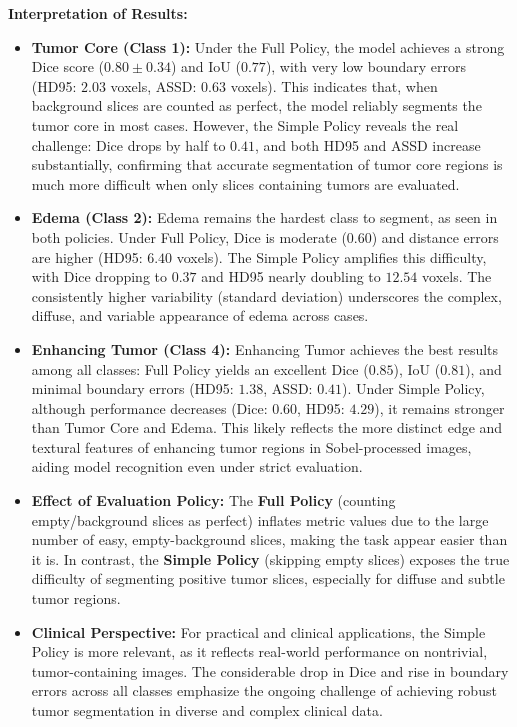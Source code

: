 \clearpage

\textbf{Interpretation of Results:}
\vspace{-1em}
\begin{itemize}
    \item \textbf{Tumor Core (Class 1):}
    Under the Full Policy, the model achieves a strong Dice score ($0.80 \pm 0.34$) and IoU ($0.77$), with very low boundary errors (HD95: $2.03$ voxels, ASSD: $0.63$ voxels). This indicates that, when background slices are counted as perfect, the model reliably segments the tumor core in most cases. However, the Simple Policy reveals the real challenge: Dice drops by half to $0.41$, and both HD95 and ASSD increase substantially, confirming that accurate segmentation of tumor core regions is much more difficult when only slices containing tumors are evaluated.

    \item \textbf{Edema (Class 2):}
    Edema remains the hardest class to segment, as seen in both policies. Under Full Policy, Dice is moderate ($0.60$) and distance errors are higher (HD95: $6.40$ voxels). The Simple Policy amplifies this difficulty, with Dice dropping to $0.37$ and HD95 nearly doubling to $12.54$ voxels. The consistently higher variability (standard deviation) underscores the complex, diffuse, and variable appearance of edema across cases.

    \item \textbf{Enhancing Tumor (Class 4):}
    Enhancing Tumor achieves the best results among all classes: Full Policy yields an excellent Dice ($0.85$), IoU ($0.81$), and minimal boundary errors (HD95: $1.38$, ASSD: $0.41$). Under Simple Policy, although performance decreases (Dice: $0.60$, HD95: $4.29$), it remains stronger than Tumor Core and Edema. This likely reflects the more distinct edge and textural features of enhancing tumor regions in Sobel-processed images, aiding model recognition even under strict evaluation.

    \item \textbf{Effect of Evaluation Policy:}
    The \textbf{Full Policy} (counting empty/background slices as perfect) inflates metric values due to the large number of easy, empty-background slices, making the task appear easier than it is. In contrast, the \textbf{Simple Policy} (skipping empty slices) exposes the true difficulty of segmenting positive tumor slices, especially for diffuse and subtle tumor regions.
    
    \item \textbf{Clinical Perspective:}
    For practical and clinical applications, the Simple Policy is more relevant, as it reflects real-world performance on nontrivial, tumor-containing images. The considerable drop in Dice and rise in boundary errors across all classes emphasize the ongoing challenge of achieving robust tumor segmentation in diverse and complex clinical data.
    

\end{itemize}
